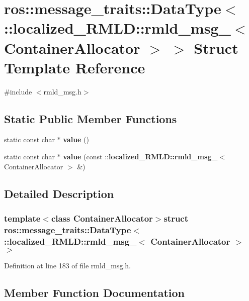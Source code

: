 \section{ros::message\_\-traits::DataType$<$ ::localized\_\-RMLD::rmld\_\-msg\_\-$<$ ContainerAllocator $>$ $>$ Struct Template Reference}
\label{structros_1_1message__traits_1_1DataType_3_01_1_1localized__RMLD_1_1rmld__msg___3_01ContainerAllocator_01_4_01_4}


{\ttfamily \#include $<$rmld\_\-msg.h$>$}

\subsection*{Static Public Member Functions}
\begin{DoxyCompactItemize}
\item 
static const char $\ast$ {\bf value} ()
\item 
static const char $\ast$ {\bf value} (const ::{\bf localized\_\-RMLD::rmld\_\-msg\_\-}$<$ ContainerAllocator $>$ \&)
\end{DoxyCompactItemize}


\subsection{Detailed Description}
\subsubsection*{template$<$class ContainerAllocator$>$struct ros::message\_\-traits::DataType$<$ ::localized\_\-RMLD::rmld\_\-msg\_\-$<$ ContainerAllocator $>$ $>$}



Definition at line 183 of file rmld\_\-msg.h.



\subsection{Member Function Documentation}
